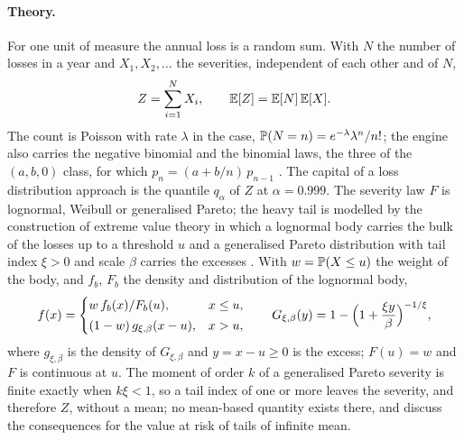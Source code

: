 \paragraph{Theory.} For one unit of measure the annual loss is a random sum. With $N$ the number of losses in a year and
$X_1,X_2,\dots$ the severities, independent of each other and of $N$,
\begin{equation}
Z=\sum_{i=1}^{N}X_i,\qquad \mathbb{E}[Z]=\mathbb{E}[N]\,\mathbb{E}[X].
\label{eq:op-annual}
\end{equation}
The count is Poisson with rate $\lambda$ in the case, $\mathbb{P}(N=n)=e^{-\lambda}\lambda^{n}/n!$; the engine also carries the negative
binomial and the binomial laws, the three of the $(a,b,0)$ class, for which $p_n=(a+b/n)\,p_{n-1}$ \citep{oprisk:shevchenko2010}. The
capital of a loss distribution approach is the quantile $q_\alpha$ of $Z$ at $\alpha=0.999$. The severity law $F$ is lognormal,
Weibull or generalised Pareto; the heavy tail is modelled by the construction of extreme value theory in which a lognormal body
carries the bulk of the losses up to a threshold $u$ and a generalised Pareto distribution with tail index $\xi>0$ and scale $\beta$
carries the excesses \citep{oprisk:chavez2006}. With $w=\mathbb{P}(X\le u)$ the weight of the body, and $f_b$, $F_b$ the density and
distribution of the lognormal body,
\begin{equation}
f(x)=\begin{cases} w\,f_b(x)/F_b(u), & x\le u,\\[2pt] (1-w)\,g_{\xi,\beta}(x-u), & x>u,\end{cases}\qquad
G_{\xi,\beta}(y)=1-\Bigl(1+\frac{\xi y}{\beta}\Bigr)^{-1/\xi},
\label{eq:op-splice}
\end{equation}
where $g_{\xi,\beta}$ is the density of $G_{\xi,\beta}$ and $y=x-u\ge0$ is the excess; $F(u)=w$ and $F$ is continuous at $u$. The
moment of order $k$ of a generalised Pareto severity is finite exactly when $k\xi<1$, so a tail index of one or more leaves the
severity, and therefore $Z$, without a mean; no mean-based quantity exists there, and \citet{oprisk:chavez2006} discuss the
consequences for the value at risk of tails of infinite mean.

